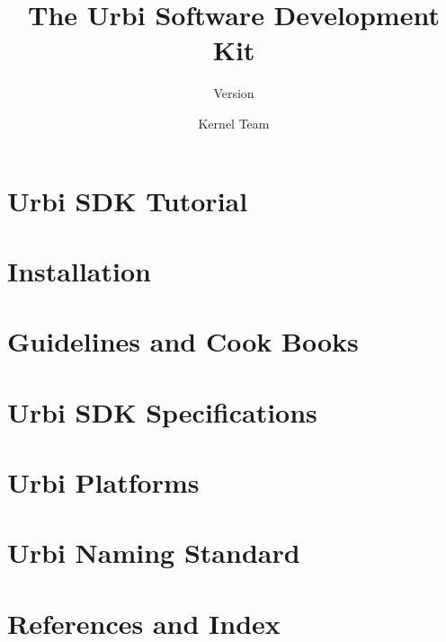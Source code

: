 \documentclass[openright,twoside,11pt]{book}
\title{The Urbi Software Development Kit}
\subtitle{Version \VcsDescription}
\author{Kernel Team}
\begin{document}
\maketitle



\tableofcontents

\part{Urbi SDK Tutorial}
\label{part:tut}





\part{Installation}
\label{part:install}


\part{Guidelines and Cook Books}
\label{part:guide}



\part{Urbi SDK Specifications}
\label{part:specs}


\part{Urbi Platforms}
\label{part:platforms}


\part{Urbi Naming Standard}
\label{part:naming}


\part{References and Index}
\label{part:ref}

\printindex
\end{document}
